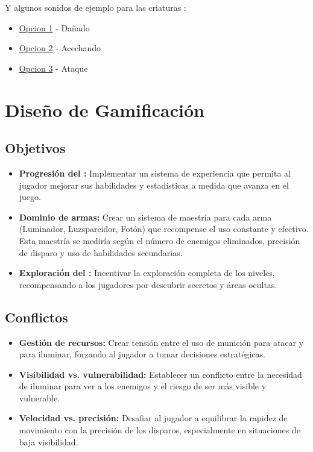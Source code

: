         Y algunos sonidos de ejemplo para las criaturas \fodder:
        \begin{itemize}
            \item \href{https://drive.google.com/open?id=1-Q6D-lYbQ08UV0V2YRYh_UzvoASzTDrT&usp=drive_fs}{Opcion 1} - Dañado
            \item \href{https://drive.google.com/open?id=1-RnyeL0Zham_IY5yZCOLxoxnW-wHrhX1&usp=drive_fs}{Opcion 2} - Acechando
            \item \href{https://drive.google.com/open?id=1-SIBq_0QMMFYzFxj3VXAsfGzK31PZcJF&usp=drive_fs}{Opcion 3} - Ataque
        \end{itemize}
\newpage

\section{Diseño de Gamificación}
    \subsection{Objetivos}
    \begin{itemize}
        \item \textbf{Progresión del \hunter:} Implementar un sistema de experiencia que permita al jugador mejorar sus habilidades y estadísticas a medida que avanza en el juego.
        \item \textbf{Dominio de armas:} Crear un sistema de maestría para cada arma (Luminador, Luzsparcidor, Fotón) que recompense el uso constante y efectivo. Esta maestría se mediría según el número de enemigos eliminados, precisión de disparo y uso de habilidades secundarias.
        \item \textbf{Exploración del \hole:} Incentivar la exploración completa de los niveles, recompensando a los jugadores por descubrir secretos y áreas ocultas.
    \end{itemize}

    \subsection{Conflictos}
    \begin{itemize}
        \item \textbf{Gestión de recursos:} Crear tensión entre el uso de munición para atacar y para iluminar, forzando al jugador a tomar decisiones estratégicas.
        \item \textbf{Visibilidad vs. vulnerabilidad:} Establecer un conflicto entre la necesidad de iluminar para ver a los enemigos y el riesgo de ser más visible y vulnerable.
        \item \textbf{Velocidad vs. precisión:} Desafiar al jugador a equilibrar la rapidez de movimiento con la precisión de los disparos, especialmente en situaciones de baja visibilidad.
    \end{itemize}

